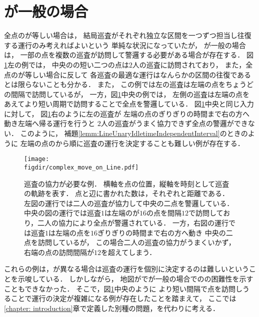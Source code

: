 \section{{\maxIdletime}が一般の場合}
\label{section:LineArbitraryIdletime}

全点の{\maxIdletime}が等しい場合は，
結局巡査がそれぞれ独立な区間を一つずつ担当し往復する運行のみ考えればよいという
単純な状況になっていたが，
{\maxIdletime}が一般の場合は，
一部の点を複数の巡査が訪問して警邏する必要がある場合が存在する．
%
図\ref{figure: complex_move_on_Line}左の例では，
中央の{\maxIdletime}の短い二つの点は$2$人の巡査に訪問されており，
また，全点の{\maxIdletime}が等しい場合に反して
各巡査の最適な運行はなんらかの区間の往復であるとは限らないことも分かる．
%
また，
この例では左の巡査は左端の点を{\maxIdletime}ちょうどの間隔で訪問しているが，
一方，図\ref{figure: complex_move_on_Line}中央の例では，
左側の巡査は左端の点をあえてより短い周期で訪問することで全点を警邏している．
図\ref{figure: complex_move_on_Line}中央と同じ入力に対して，
図\ref{figure: complex_move_on_Line}右のように左の巡査が
左端の点の{\maxIdletime}ぎりぎりの時間まで右の方へ動き左端へ帰る運行を行うと
$2$人の巡査がうまく協力できず全点の警邏ができない．
このように，
補題\ref{lemm:LineUnaryIdletimeIndependentInterval}のときのように
左端の点の{\maxIdletime}から順に巡査の運行を決定することも難しい例が存在する．

\begin{figure}[htbp]
  \centering
  \texttt{[image: \\figdir/complex\_move\_on\_Line.pdf]}
  \caption{巡査の協力が必要な例．
    横軸を点の位置，縦軸を時刻として巡査の軌跡を表す．
    点と辺に書かれた数は，それぞれ{\maxIdletime}と距離である．
    左図の運行では二人の巡査が協力して中央の二点を警邏している．
    中央の図の運行では巡査$1$は左端の{\maxIdletime}が$16$の点を間隔$12$で訪問しており，二人の協力により全点が警邏されている．
    一方，右図の運行では巡査$1$は左端の点を{\maxIdletime}$16$ぎりぎりの時間まで右の方へ動き
    中央の二点を訪問しているが，
    この場合二人の巡査の協力がうまくいかず，
    右端の点の訪問間隔が{\maxIdletime}$12$を超えてしまう．
    \label{figure: complex_move_on_Line}}
\end{figure}


これらの例は，{\maxIdletime}が異なる場合は巡査の運行を個別に決定するのは難しいということを示唆している．
しかしながら，
地図が{\graphLine}で{\maxIdletime}が一般の場合での{\PPProfit}の困難性を示すこともできなかった．
そこで，図\ref{figure: complex_move_on_Line}中央のように
{\maxIdletime}より短い間隔で点を訪問しうることで運行の決定が複雑になる例が存在したことを踏まえて，
ここでは\ref{chapter: introduction}章で定義した別種の問題，{\timeSpecifiedPP}を代わりに考える．



